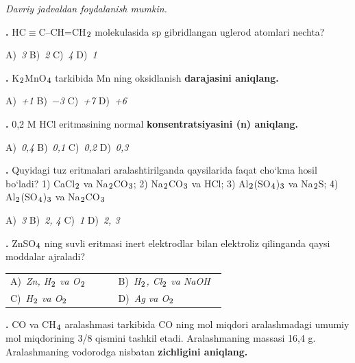 \documentclass[11pt,a4paper]{article}
\renewcommand{\normalsize}{\fontsize{10.9}{13.4}\selectfont}
\renewcommand{\textsubscript}[1]{\ensuremath{_{\text{\fontsize{8}{8}\selectfont #1}}}}
\newcommand{\qn}[1]{\textbf{\fontsize{11.5}{13}\selectfont #1}}
\newcommand{\qsep}{\par\vspace{13pt}}
\begin{document}
\normalsize
\thispagestyle{first}
\noindent\textit{Davriy jadvaldan foydalanish mumkin.}
\par\smallskip
\begin{multicols}{2}
\noindent\qn{1.} HC$\equiv$C--CH=CH\textsubscript{2} molekulasida sp gibridlangan uglerod atomlari nechta?

\noindent A)~\textsl{3} \hfill B)~\textsl{2} \hfill C)~\textsl{4} \hfill D)~\textsl{1}\par
\qsep
\noindent\qn{2.} K\textsubscript{2}MnO\textsubscript{4} tarkibida Mn ning oksidlanish \textbf{darajasini aniqlang.}

\noindent A)~\textsl{+1} \hfill B)~\textsl{$-$3} \hfill C)~\textsl{+7} \hfill D)~\textsl{+6}\par
\qsep
\noindent\qn{3.} 0,2 M HCl eritmasining normal \textbf{konsentratsiyasini (n) aniqlang.}

\noindent A)~\textsl{0,4} \hfill B)~\textsl{0,1} \hfill C)~\textsl{0,2} \hfill D)~\textsl{0,3}\par
\qsep
\noindent\qn{4.} Quyidagi tuz eritmalari aralashtirilganda qaysilarida faqat cho`kma hosil bo`ladi? 1) CaCl\textsubscript{2} va Na\textsubscript{2}CO\textsubscript{3}; 2) Na\textsubscript{2}CO\textsubscript{3} va HCl; 3) Al\textsubscript{2}(SO\textsubscript{4})\textsubscript{3} va Na\textsubscript{2}S; 4) Al\textsubscript{2}(SO\textsubscript{4})\textsubscript{3} va Na\textsubscript{2}CO\textsubscript{3}

\noindent A)~\textsl{3} \hfill B)~\textsl{2, 4} \hfill C)~\textsl{1} \hfill D)~\textsl{2, 3}\par
\qsep
\noindent\qn{5.} ZnSO\textsubscript{4} ning suvli eritmasi inert elektrodlar bilan elektroliz qilinganda qaysi moddalar ajraladi?

\noindent\begin{tabular}{@{}p{0.47\linewidth}@{}p{0.47\linewidth}@{}}
A)~\textsl{Zn, H\textsubscript{2} va O\textsubscript{2}} & B)~\textsl{H\textsubscript{2}, Cl\textsubscript{2} va NaOH} \\
C)~\textsl{H\textsubscript{2} va O\textsubscript{2}} & D)~\textsl{Ag va O\textsubscript{2}} \\
\end{tabular}\par
\qsep
\noindent\qn{6.} CO va CH\textsubscript{4} aralashmasi tarkibida CO ning mol miqdori aralashmadagi umumiy mol miqdorining 3/8 qismini tashkil etadi. Aralashmaning massasi 16,4 g. Aralashmaning vodorodga nisbatan \textbf{zichligini aniqlang.}


\end{multicols}
\end{document}
